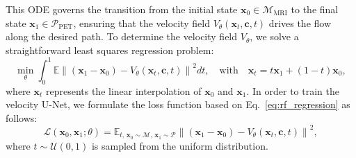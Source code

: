 \documentclass{article}
\begin{document}
This ODE governs the transition from the initial state $\mathbf{x}_0 \in \mathcal{M}_{\text{MRI}}$ to the final state $\mathbf{x}_1 \in \mathcal{P}_{\text{PET}}$, ensuring that the velocity field $V_\theta(\mathbf{x}_t, \mathbf{c}, t)$ drives the flow along the desired path. To determine the velocity field $V_\theta$, we solve a straightforward least squares regression problem:
\begin{equation}
\min_{\theta} \int_0^1 \mathbb{E} \left\| (\mathbf{x}_1 - \mathbf{x}_0) - V_\theta(\mathbf{x}_t, \mathbf{c}, t) \right\|^2 dt, \quad \text{with} \quad \mathbf{x}_t = t\mathbf{x}_1 + (1-t)\mathbf{x}_0,
\label{eq:rf_regression}
\end{equation}
where $\mathbf{x}_t$ represents the linear interpolation of $\mathbf{x}_0$ and $\mathbf{x}_1$. In order to train the velocity U-Net, we formulate the loss function based on Eq.~\eqref{eq:rf_regression} as follows:
\begin{equation}
\mathcal{L}(\mathbf{x}_0, \mathbf{x}_1; \theta) = \mathbb{E}_{t,\, \mathbf{x}_0 \sim \mathcal{M},\, \mathbf{x}_1 \sim \mathcal{P}} \left\| (\mathbf{x}_1 - \mathbf{x}_0) - V_\theta(\mathbf{x}_t, \mathbf{c}, t) \right\|^2,
\label{eq:rf_loss}
\end{equation}
where $t \sim \mathcal{U}(0, 1)$ is sampled from the uniform distribution.
\end{document}
